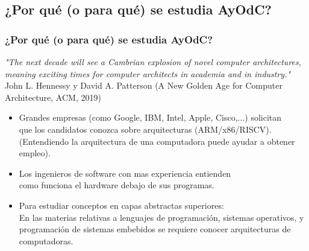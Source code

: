\documentclass[aspectratio=169,compress]{beamer}
\begin{document}
\subsection{¿Por qué (o para qué) se estudia AyOdC?}

\begin{frame}[fragile]
  \frametitle{¿Por qué (o para qué) se estudia AyOdC?}
\begin{small}
\textit{"The next decade will see a Cambrian explosion of novel computer architectures, meaning exciting times for computer architects in academia and in industry."}
John L. Hennessy y David A. Patterson 
(A New Golden Age for Computer Architecture, ACM, 2019)
\end{small}

\bigskip
\begin{small}
\begin{itemize}
\item Grandes empresas (como Google, IBM, Intel, Apple, Cisco,...)
solicitan \\ que los candidatos conozca sobre arquitecturas (ARM/x86/RISCV).\\
(Entendiendo la arquitectura de una computadora puede ayudar a obtener empleo).

\item Los ingenieros de software con mas experiencia entienden \\ como funciona el hardware debajo de sus programas.

\item Para estudiar conceptos en capas abstractas superiores: \\
En las materias relativas a lenguajes de programación, sistemas operativos, y programación de sistemas embebidos se requiere conocer arquitecturas de computadoras.

\end{itemize}
\end{small}

\end{frame}
\end{document}
